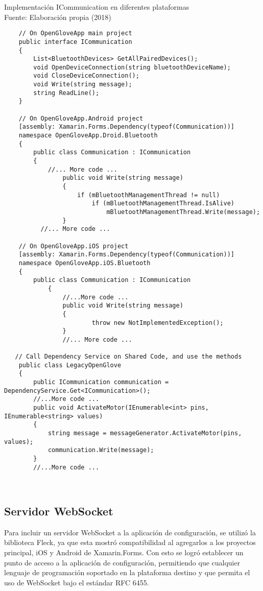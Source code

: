 \begin{algorithm}[!ht]
  \begin{center}
   	\captionsetup{justification=centering}
    \caption[Implementación ICommunication en diferentes plataformas]{Implementación ICommunication en diferentes plataformas
    \\ \tab[4cm] Fuente: Elaboración propia (2018)}
    \label{code:implementation-csharp-ll}
  \end{center}
  \begin{lstlisting}
	// On OpenGloveApp main project
    public interface ICommunication
    {
        List<BluetoothDevices> GetAllPairedDevices();
        void OpenDeviceConnection(string bluetoothDeviceName);
        void CloseDeviceConnection();
        void Write(string message);
        string ReadLine();
    }
    
    // On OpenGloveApp.Android project
    [assembly: Xamarin.Forms.Dependency(typeof(Communication))]
	namespace OpenGloveApp.Droid.Bluetooth
	{
	    public class Communication : ICommunication
	    {
       	 	//... More code ...
	    		public void Write(string message)
        		{
            		if (mBluetoothManagementThread != null)
                		if (mBluetoothManagementThread.IsAlive)
                    		mBluetoothManagementThread.Write(message);
        		}		
       	  //... More code ...
       	  
    // On OpenGloveApp.iOS project
    [assembly: Xamarin.Forms.Dependency(typeof(Communication))]
	namespace OpenGloveApp.iOS.Bluetooth
	{
		public class Communication : ICommunication
    		{
        		//...More code ...
        		public void Write(string message)
	        	{
    	        		throw new NotImplementedException();
        		}
        		//... More code ...

   // Call Dependency Service on Shared Code, and use the methods
    public class LegacyOpenGlove
    {
        public ICommunication communication = DependencyService.Get<ICommunication>();        
        //...More code ...
        public void ActivateMotor(IEnumerable<int> pins, IEnumerable<string> values)
        {
            string message = messageGenerator.ActivateMotor(pins, values);
            communication.Write(message);
        }
        //...More code ...
   
   
\end{lstlisting}
\end{algorithm}


\subsection{Servidor WebSocket}
Para incluir un servidor WebSocket a la aplicación de configuración, se utilizó la biblioteca Fleck, ya que esta mostró compatibilidad al agregarlos a los proyectos principal, iOS y Android de Xamarin.Forms. Con esto se logró establecer un punto de acceso a la aplicación de configuración, permitiendo que cualquier lenguaje de programación soportado en la plataforma destino y que permita el uso de WebSocket bajo el estándar RFC 6455.



